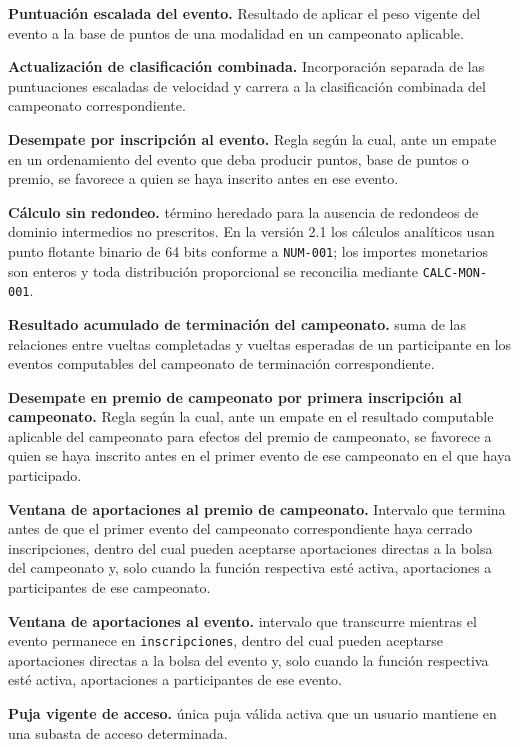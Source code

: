\documentclass[10pt,letterpaper]{article}
\begin{document}
\noindent\textbf{Puntuación escalada del evento.} Resultado de aplicar el peso vigente del evento a la base de puntos de una modalidad en un campeonato aplicable.\par
\noindent\textbf{Actualización de clasificación combinada.} Incorporación separada de las puntuaciones escaladas de velocidad y carrera a la clasificación combinada del campeonato correspondiente.\par
\noindent\textbf{Desempate por inscripción al evento.} Regla según la cual, ante un empate en un ordenamiento del evento que deba producir puntos, base de puntos o premio, se favorece a quien se haya inscrito antes en ese evento.\par
\noindent\textbf{Cálculo sin redondeo.} término heredado para la ausencia de redondeos de dominio intermedios no prescritos. En la versión 2.1 los cálculos analíticos usan punto flotante binario de 64 bits conforme a \texttt{NUM-001}; los importes monetarios son enteros y toda distribución proporcional se reconcilia mediante \texttt{CALC-MON-001}.\par
\noindent\textbf{Resultado acumulado de terminación del campeonato.} suma de las relaciones entre vueltas completadas y vueltas esperadas de un participante en los eventos computables del campeonato de terminación correspondiente.\par
\noindent\textbf{Desempate en premio de campeonato por primera inscripción al campeonato.} Regla según la cual, ante un empate en el resultado computable aplicable del campeonato para efectos del premio de campeonato, se favorece a quien se haya inscrito antes en el primer evento de ese campeonato en el que haya participado.\par
\noindent\textbf{Ventana de aportaciones al premio de campeonato.} Intervalo que termina antes de que el primer evento del campeonato correspondiente haya cerrado inscripciones, dentro del cual pueden aceptarse aportaciones directas a la bolsa del campeonato y, solo cuando la función respectiva esté activa, aportaciones a participantes de ese campeonato.\par
\noindent\textbf{Ventana de aportaciones al evento.} intervalo que transcurre mientras el evento permanece en \texttt{inscripciones}, dentro del cual pueden aceptarse aportaciones directas a la bolsa del evento y, solo cuando la función respectiva esté activa, aportaciones a participantes de ese evento.\par
\noindent\textbf{Puja vigente de acceso.} única puja válida activa que un usuario mantiene en una subasta de acceso determinada.\par
\end{document}
